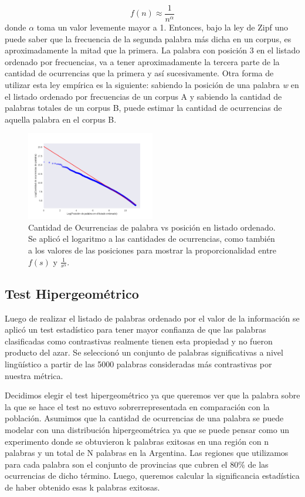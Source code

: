 $$f(n) \approx \frac{1}{n^{\alpha}}$$
donde $\alpha$ toma un valor levemente mayor a 1.
Entonces, bajo la ley de Zipf uno puede saber que la frecuencia de la segunda palabra más dicha en un corpus, es aproximadamente la mitad que la primera. La palabra con posición 3 en el listado ordenado por frecuencias, va a tener aproximadamente la tercera parte de la cantidad de ocurrencias que la primera y así sucesivamente. Otra forma de utilizar esta ley empírica es la siguiente:
sabiendo la posición de una palabra \textit{w} en el listado ordenado por frecuencias de un corpus A y sabiendo la cantidad de palabras totales de un corpus B, puede estimar la cantidad de ocurrencias de aquella palabra en el corpus B.
\begin{figure}[!ht]
\centering
\includegraphics[width=0.5\textwidth]{./images/zipf.pdf}
\caption{Cantidad de Ocurrencias de palabra vs posición en listado ordenado. Se aplicó el logaritmo a las cantidades de ocurrencias, como también a los valores de las posiciones para mostrar la proporcionalidad entre $f(s)$ y $\frac{1}{s^{\alpha}}$.} 
\label{fig:zipf} 
\end{figure}


\subsection{Test Hipergeométrico}
Luego de realizar el listado de palabras ordenado por el valor de la información se aplicó un test estadístico para tener mayor confianza de que las palabras clasificadas como contrastivas realmente tienen esta propiedad y no fueron producto del azar. Se seleccionó un conjunto de palabras significativas a nivel lingüístico a partir de las 5000 palabras consideradas más contrastivas por nuestra métrica. 

Decidimos elegir el test hipergeométrico ya que queremos ver que la palabra sobre la que se hace el test no estuvo sobrerrepresentada en comparación con la población. Asumimos que la cantidad de ocurrencias de una palabra se puede modelar con una distribución hipergeométrica ya que se puede pensar como un experimento donde se obtuvieron k palabras exitosas en una región con n palabras y un total de N palabras en la Argentina. Las regiones que utilizamos para cada palabra son el conjunto de provincias que cubren el 80\% de las ocurrencias de dicho término. Luego, queremos calcular la significancia estadística de haber obtenido esas k palabras exitosas.

